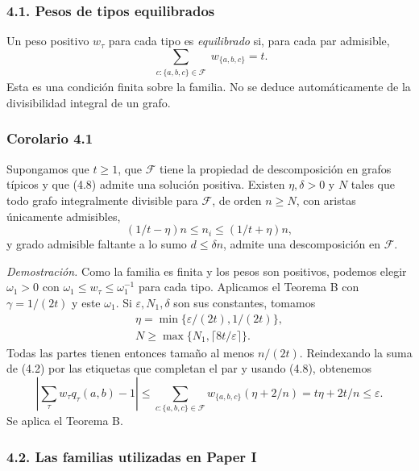 \documentclass[spanish,11pt,a4paper]{article}
\begin{document}
\subsubsection{4.1. Pesos de tipos equilibrados}\label{pesos-de-tipos-equilibrados}

Un peso positivo \(w_\tau\) para cada tipo es \emph{equilibrado} si, para cada par admisible, \[\sum_{\substack{c:\{a,b,c\}\in\mathcal F}}w_{\{a,b,c\}}=t.
\tag{4.8}\] Esta es una condición finita sobre la familia. No se deduce automáticamente de la divisibilidad integral de un grafo.

\subsubsection{Corolario 4.1}\label{corolario-4.1}

Supongamos que \(t\ge1\), que \(\mathcal F\) tiene la propiedad de descomposición en grafos típicos y que (4.8) admite una solución positiva. Existen \(\eta,\delta>0\) y \(N\) tales que todo grafo integralmente divisible para \(\mathcal F\), de orden \(n\ge N\), con aristas únicamente admisibles, \[(1/t-\eta)n\le n_i\le(1/t+\eta)n,
\tag{4.9}\] y grado admisible faltante a lo sumo \(d\le\delta n\), admite una descomposición en \(\mathcal F\).

\emph{Demostración.} Como la familia es finita y los pesos son positivos, podemos elegir \(\omega_1>0\) con \(\omega_1\le w_\tau\le\omega_1^{-1}\) para cada tipo. Aplicamos el Teorema B con \(\gamma=1/(2t)\) y este \(\omega_1\). Si \(\varepsilon,N_1,\delta\) son sus constantes, tomamos \[\begin{gathered}
\eta=\min\{\varepsilon/(2t),1/(2t)\},\\
N\ge\max\{N_1,\lceil8t/\varepsilon\rceil\}.
\end{gathered}
\tag{4.10}\] Todas las partes tienen entonces tamaño al menos \(n/(2t)\). Reindexando la suma de (4.2) por las etiquetas que completan el par y usando (4.8), obtenemos \[\left|\sum_\tau w_\tau q_\tau(a,b)-1\right|
\le\sum_{c:\{a,b,c\}\in\mathcal F}
w_{\{a,b,c\}}(\eta+2/n)
=t\eta+2t/n\le\varepsilon.
\tag{4.11}\] Se aplica el Teorema B.

\subsubsection{4.2. Las familias utilizadas en Paper I}\label{las-familias-utilizadas-en-paper-i}
\end{document}

